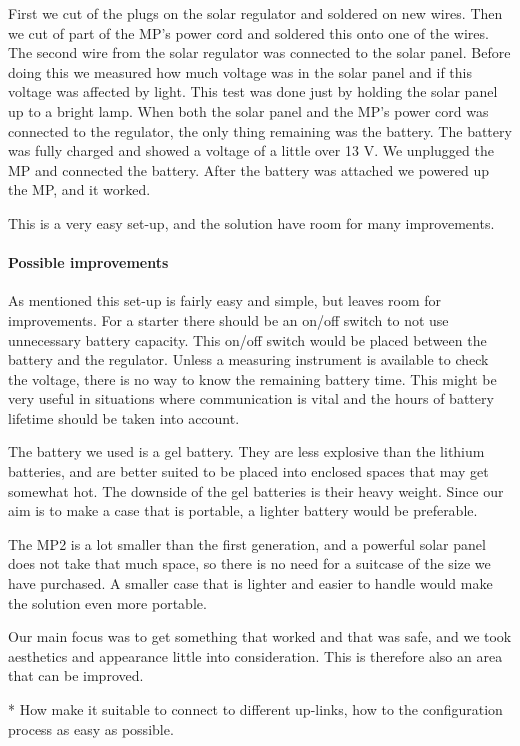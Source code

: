 First we cut of the plugs on the solar regulator and soldered on new wires. Then we cut of part of the MP's power cord and soldered this onto one of the wires. The second wire from the solar regulator was connected to the solar panel. Before doing this we measured how much voltage was in the solar panel and if this voltage was affected by light. This test was done just by holding the solar panel up to a bright lamp. When both the solar panel and the MP's power cord was connected to the regulator, the only thing remaining was the battery. The battery was fully charged and showed a voltage of a little over 13 V. We unplugged the MP and connected the battery. After the battery was attached we powered up the MP, and it worked. 

This is a very easy set-up, and the solution have room for many improvements. 


\paragraph{Possible improvements }
As mentioned this set-up is fairly easy and simple, but leaves room for improvements. For a starter there should be an on/off switch to not use unnecessary battery capacity. This on/off switch would be placed between the battery and the regulator. Unless a measuring instrument is available to check the voltage, there is no way to know the remaining battery time. This might be very useful in situations where communication is vital and the hours of battery lifetime should be taken into account.

The battery we used is a gel battery. They are less explosive than the lithium batteries, and are better suited to be placed into enclosed spaces that may get somewhat hot. The downside of the gel batteries is their heavy weight. Since our aim is to make a case that is portable, a lighter battery would be preferable. 

The MP2 is a lot smaller than the first generation, and a powerful solar panel does not take that much space, so there is no need for a suitcase of the size we have purchased. A smaller case that is lighter and easier to handle would make the solution even more portable. 

Our main focus was to get something that worked and that was safe, and we took aesthetics and appearance little into consideration. This is therefore also an area that can be improved. 

* How make it suitable to connect to different up-links, how to the configuration process as easy as possible. 

